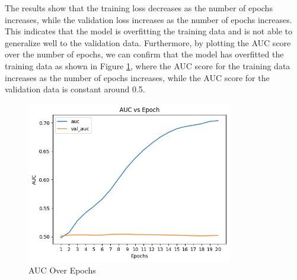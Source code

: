 The results show that the training loss decreases as the number of epochs increases, while the validation loss increases as the number of epochs increases. This indicates that the model is overfitting the training data and is not able to generalize well to the validation data. Furthermore, by plotting the AUC score over the number of epochs, we can confirm that the model has overfitted the training data as shown in Figure \ref{fig:AUCOverEpochs}, where the AUC score for the training data increases as the number of epochs increases, while the AUC score for the validation data is constant around 0.5.


\begin{figure}[H]
    \centering
    \includegraphics[width=0.8\textwidth]{assets/auc_epochs_20.png}
    \caption[AUC Over Epochs]{AUC Over Epochs}
    \label{fig:AUCOverEpochs}
\end{figure}

